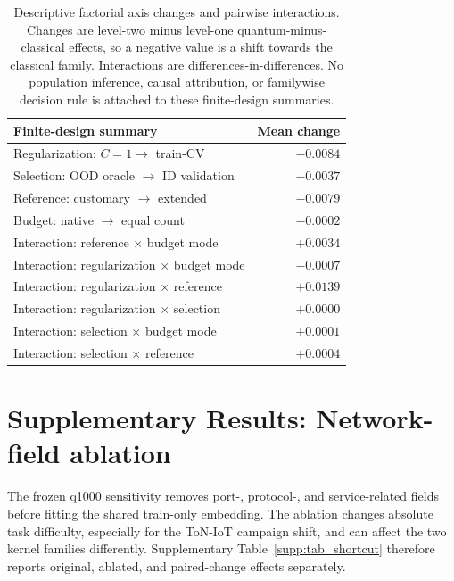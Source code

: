 \documentclass[11pt]{article}
\begin{document}
\begin{table}[htbp]
\centering
\caption{Descriptive factorial axis changes and pairwise interactions.
Changes are level-two minus level-one quantum-minus-classical effects, so a
negative value is a shift towards the classical family. Interactions are
differences-in-differences. No population inference, causal attribution, or
familywise decision rule is attached to these finite-design summaries.}
\label{supp:tab_factorial_contrasts}
\scriptsize
\setlength{\tabcolsep}{5pt}
\begin{tabular}{lr}
\toprule
Finite-design summary & Mean change \\
\midrule
Regularization: $C=1\to$ train-CV & $-0.0084$ \\
Selection: OOD oracle $\to$ ID validation & $-0.0037$ \\
Reference: customary $\to$ extended & $-0.0079$ \\
Budget: native $\to$ equal count & $-0.0002$ \\
\addlinespace
Interaction: reference $\times$ budget mode & $+0.0034$ \\
Interaction: regularization $\times$ budget mode & $-0.0007$ \\
Interaction: regularization $\times$ reference & $+0.0139$ \\
Interaction: regularization $\times$ selection & $+0.0000$ \\
Interaction: selection $\times$ budget mode & $+0.0001$ \\
Interaction: selection $\times$ reference & $+0.0004$ \\
\bottomrule
\end{tabular}
\end{table}

\section*{Supplementary Results: Network-field ablation}
\label{supp:shortcut}

The frozen q1000 sensitivity removes port-, protocol-, and service-related
fields before fitting the shared train-only embedding. The ablation changes
absolute task difficulty, especially for the ToN-IoT campaign shift, and can
affect the two kernel families differently. Supplementary Table~\ref{supp:tab_shortcut}
therefore reports original, ablated, and paired-change effects separately.
\end{document}
